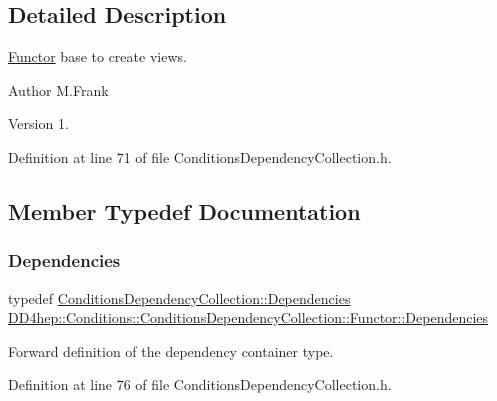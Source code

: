 \subsection{Detailed Description}
\hyperlink{class_d_d4hep_1_1_conditions_1_1_conditions_dependency_collection_1_1_functor}{Functor} base to create views. 

\begin{DoxyAuthor}{Author}
M.\+Frank 
\end{DoxyAuthor}
\begin{DoxyVersion}{Version}
1. 
\end{DoxyVersion}


Definition at line 71 of file Conditions\+Dependency\+Collection.\+h.



\subsection{Member Typedef Documentation}
\hypertarget{class_d_d4hep_1_1_conditions_1_1_conditions_dependency_collection_1_1_functor_adaf7b6e0ec9fa1b67ee3b24924780152}{}\label{class_d_d4hep_1_1_conditions_1_1_conditions_dependency_collection_1_1_functor_adaf7b6e0ec9fa1b67ee3b24924780152} 
\subsubsection{\texorpdfstring{Dependencies}{Dependencies}}
{\footnotesize\ttfamily typedef \hyperlink{class_d_d4hep_1_1_conditions_1_1_conditions_dependency_collection_a7fb4072b6036f59389b929e312e2679c}{Conditions\+Dependency\+Collection\+::\+Dependencies} \hyperlink{class_d_d4hep_1_1_conditions_1_1_conditions_dependency_collection_1_1_functor_adaf7b6e0ec9fa1b67ee3b24924780152}{D\+D4hep\+::\+Conditions\+::\+Conditions\+Dependency\+Collection\+::\+Functor\+::\+Dependencies}}



Forward definition of the dependency container type. 



Definition at line 76 of file Conditions\+Dependency\+Collection.\+h.

